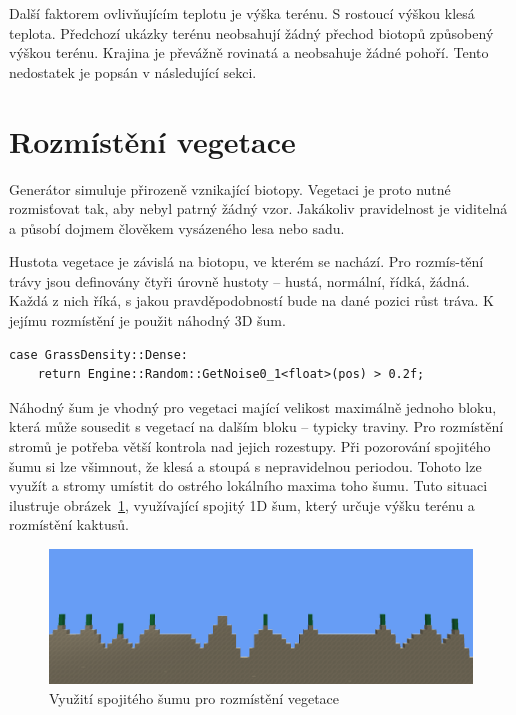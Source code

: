 \documentclass[thesis=M,czech]{FITthesis}[2019/12/23]
\begin{document}
Další faktorem ovlivňujícím teplotu je výška terénu. S rostoucí výškou klesá teplota. Předchozí ukázky terénu neobsahují žádný přechod biotopů způsobený výškou terénu. Krajina je převážně rovinatá a neobsahuje žádné pohoří. Tento nedostatek je popsán v následující sekci.

\section{Rozmístění vegetace}

Generátor simuluje přirozeně vznikající biotopy. Vegetaci je proto nutné rozmisťovat tak, aby nebyl patrný žádný vzor. Jakákoliv pravidelnost je viditelná a působí dojmem člověkem vysázeného lesa nebo sadu.

Hustota vegetace je závislá na biotopu, ve kterém se nachází. Pro rozmís-tění trávy jsou definovány čtyři úrovně hustoty -- hustá, normální, řídká, žádná. Každá z nich říká, s jakou pravděpodobností bude na dané pozici růst tráva. K jejímu rozmístění je použit náhodný 3D šum.

\begin{verbatim}
case GrassDensity::Dense:
    return Engine::Random::GetNoise0_1<float>(pos) > 0.2f;
\end{verbatim}

Náhodný šum je vhodný pro vegetaci mající velikost maximálně jednoho bloku, která může sousedit s vegetací na dalším bloku -- typicky traviny. Pro rozmístění stromů je potřeba větší kontrola nad jejich rozestupy. Při pozorování spojitého šumu si lze všimnout, že klesá a stoupá s nepravidelnou periodou. Tohoto lze využít a stromy umístit do ostrého lokálního maxima toho šumu. Tuto situaci ilustruje obrázek~\ref{fig:cactus}, využívající spojitý 1D šum, který určuje výšku terénu a rozmístění kaktusů.

\begin{figure}\centering
	\includegraphics[width=\textwidth]{images/world_gen/cactus}
	\caption[Využití spojitého šumu pro rozmístění vegetace]{Využití spojitého šumu pro rozmístění vegetace}\label{fig:cactus}
\end{figure}
\end{document}
